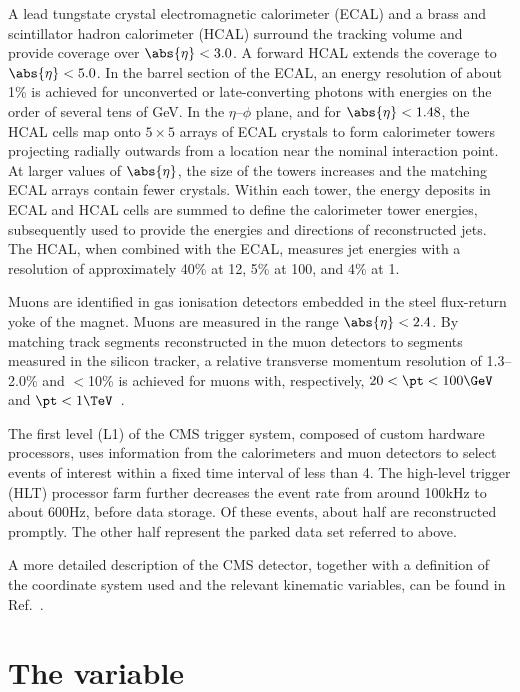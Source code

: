 A lead tungstate crystal electromagnetic calorimeter (ECAL) and a
brass and scintillator hadron calorimeter (HCAL) surround the tracking
volume and provide coverage over $\abs{\eta} < 3.0$. A forward HCAL
extends the coverage to $\abs{\eta} < 5.0$. In the barrel section of
the ECAL, an energy resolution of about 1\% is achieved for
unconverted or late-converting photons with energies on the order of
several tens of GeV. In the $\eta$--$\phi$ plane, and for $\abs{\eta}<
1.48$, the HCAL cells map onto $5 \times 5$ arrays of ECAL crystals to
form calorimeter towers projecting radially outwards from a location
near the nominal interaction point. At larger values of $\abs{ \eta
}$, the size of the towers increases and the matching ECAL arrays
contain fewer crystals. Within each tower, the energy deposits in ECAL
and HCAL cells are summed to define the calorimeter tower energies,
subsequently used to provide the energies and directions of
reconstructed jets. The HCAL, when combined with the ECAL, measures
jet energies with a resolution of approximately 40\% at 12\GeV, 5\% at
100\GeV, and 4\% at 1\TeV.

Muons are identified in gas ionisation detectors embedded in the steel
flux-return yoke of the magnet. Muons are measured in the range
$\abs{\eta}< 2.4$. By matching track segments reconstructed in the
muon detectors to segments measured in the silicon tracker, a relative
transverse momentum resolution of 1.3--2.0\% and $<$10\% is achieved
for muons with, respectively, $20 <\pt < 100\GeV$ and $\pt <
1\TeV$~\cite{Chatrchyan:2012xi}.

The first level (L1) of the CMS trigger system, composed of custom
hardware processors, uses information from the calorimeters and muon
detectors to select events of interest within a fixed time interval of
less than 4\mus. The high-level trigger (HLT) processor farm further
decreases the event rate from around 100\unit{kHz} to about
600\unit{Hz}, before data storage. Of these events, about half are
reconstructed promptly. The other half represent the parked data set
referred to above.

A more detailed description of the CMS detector, together with a
definition of the coordinate system used and the relevant kinematic
variables, can be found in Ref.~\cite{Chatrchyan:2008zzk}.

\section{The \texorpdfstring{\alphat}{AlphaT} variable\label{sec:alphat}}

